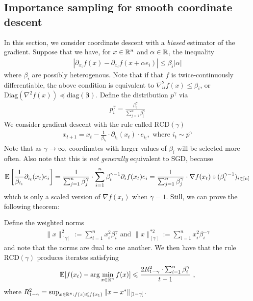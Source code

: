 	\subsection{Importance sampling for smooth coordinate descent}
	In this section, we consider coordinate descent with a \emph{biased}
  estimator of the gradient. Suppose that we have, for $x \in \mathbb{R}^n$
  and $\alpha \in \mathbb{R}$, the inequality
	\begin{eqnarray}
    |\partial_{x_i} f(x) - \partial_{x_i} f(x + \alpha e_i)|
    \le \beta_{i}|\alpha|
	\end{eqnarray}
	where $\beta_i$ are possibly heterogenous. Note that if that $f$ is twice-continuously differentiable, the above condition is equivalent to $\nabla^2_{ii}f(x) \le \beta_i$, or $\mathrm{Diag}(\nabla^2 f(x)) \preceq \mathrm{diag}(\boldsymbol{\beta})$.  Define the distribution $p^\gamma$ via
	\begin{eqnarray}
	p^{\gamma}_i = \frac{\beta_i^{\gamma}}{\sum_{j=1}^n \beta_j^{\gamma}}
	\end{eqnarray}
	We consider gradient descent with the rule called $\mathrm{RCD}(\gamma)$
	\begin{eqnarray}\label{RCDgamma}
    x_{t+1} = x_t - \frac{1}{\beta_{i_t}} \cdot \partial_{i_t}(x_t) \cdot e_{i_t}, \text{ where } i_t \sim p^{\gamma}
	\end{eqnarray}
  Note that as $\gamma \to \infty$, coordinates with larger values of $\beta_i$
  will be selected more often.
	Also note that this is \emph{not generally} equivalent to SGD, because 
	\begin{eqnarray}
    \operatorname*{\mathbb{E}}\left[\frac{1}{\beta_{i_t}}\partial_{i_t}(x_t)e_i\right]
    = \frac{1}{\sum_{j=1}^n \beta_j^{\gamma}} \cdot \sum_{i=1}^n \beta_{i}^{\gamma - 1} \partial_i f(x_t)e_i
    = \frac{1}{\sum_{j=1}^n \beta_j^{\gamma}} \cdot \nabla f(x_t) \circ (\beta_i^{\gamma - 1})_{i \in [n]}
	\end{eqnarray}
	which is only a scaled version of $\nabla f(x_t)$ when $\gamma = 1$. Still, we can prove the following theorem:
	\begin{theorem}
  \label{thm:6.7}
  Define the weighted norms
	\begin{eqnarray}
	\|x\|_{[\gamma]}^2 := \sum_{i=1}^n x_i^2 \beta_i^\gamma \text{ and } \|x\|_{[\gamma]}^{*2} := \sum_{i=1}^n x_i^2 \beta_i^{-\gamma}
	\end{eqnarray}
	and note that the norms are dual to one another.
  We then have that the rule $\mathrm{RCD}(\gamma)$ produces iterates satisfying
	\begin{eqnarray}
	  \operatorname*{\mathbb{E}}[f(x_t) - \arg\min_{x \in \mathbb{R}^{n}} f(x)]
    \leqslant \frac{2 R^2_{1-\gamma} \cdot \sum_{i=1}^n \beta_{i}^{\gamma}}{t-1}~,
	\end{eqnarray}
	where $R^2_{1-\gamma} = \sup_{x \in \mathbb{R}^n:f(x) \leqslant f(x_1)} \|x - x^*\|_{[1 - \gamma]}$.
	\end{theorem}
